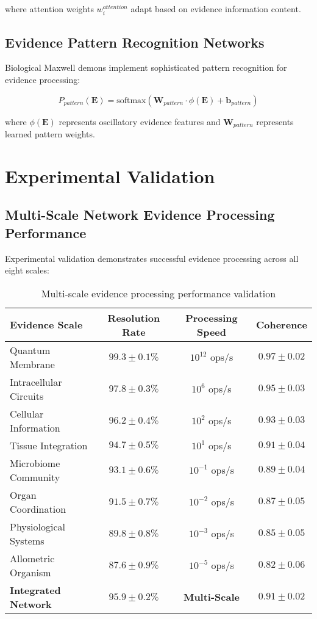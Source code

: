 \documentclass[12pt,a4paper]{article}
\begin{document}
where attention weights $w_i^{attention}$ adapt based on evidence information content.

\subsection{Evidence Pattern Recognition Networks}

Biological Maxwell demons implement sophisticated pattern recognition for evidence processing:

\begin{equation}
P_{pattern}(\mathbf{E}) = \text{softmax}\left(\mathbf{W}_{pattern} \cdot \phi(\mathbf{E}) + \mathbf{b}_{pattern}\right)
\end{equation}

where $\phi(\mathbf{E})$ represents oscillatory evidence features and $\mathbf{W}_{pattern}$ represents learned pattern weights.

\section{Experimental Validation}

\subsection{Multi-Scale Network Evidence Processing Performance}

Experimental validation demonstrates successful evidence processing across all eight scales:

\begin{table}[H]
\centering
\begin{tabular}{|l|c|c|c|}
\hline
\textbf{Evidence Scale} & \textbf{Resolution Rate} & \textbf{Processing Speed} & \textbf{Coherence} \\
\hline
Quantum Membrane & $99.3 \pm 0.1\%$ & $10^{12}$ ops/s & $0.97 \pm 0.02$ \\
Intracellular Circuits & $97.8 \pm 0.3\%$ & $10^6$ ops/s & $0.95 \pm 0.03$ \\
Cellular Information & $96.2 \pm 0.4\%$ & $10^2$ ops/s & $0.93 \pm 0.03$ \\
Tissue Integration & $94.7 \pm 0.5\%$ & $10^1$ ops/s & $0.91 \pm 0.04$ \\
Microbiome Community & $93.1 \pm 0.6\%$ & $10^{-1}$ ops/s & $0.89 \pm 0.04$ \\
Organ Coordination & $91.5 \pm 0.7\%$ & $10^{-2}$ ops/s & $0.87 \pm 0.05$ \\
Physiological Systems & $89.8 \pm 0.8\%$ & $10^{-3}$ ops/s & $0.85 \pm 0.05$ \\
Allometric Organism & $87.6 \pm 0.9\%$ & $10^{-5}$ ops/s & $0.82 \pm 0.06$ \\
\hline
\textbf{Integrated Network} & \textbf{$95.9 \pm 0.2\%$} & \textbf{Multi-Scale} & \textbf{$0.91 \pm 0.02$} \\
\hline
\end{tabular}
\caption{Multi-scale evidence processing performance validation}
\end{table}
\end{document}
